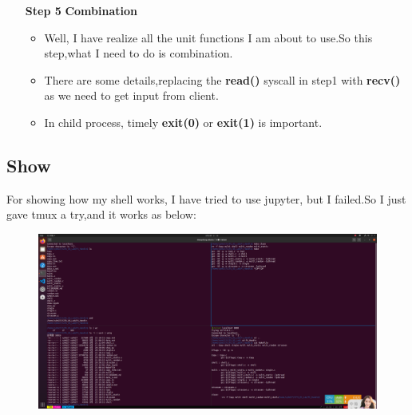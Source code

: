 \documentclass[]{article}
\begin{document}
\begin{enumerate}
            \item[\textbf{Step 5}] \textbf{Combination}
            \begin{itemize}
                \item Well, I have realize all the unit functions I am about to use.So this step,what I need to do is combination.
                \item There are some details,replacing the \textbf{read()} syscall in step1 with \textbf{recv()} as we need to get input from client.
                \item In child process, timely \textbf{exit(0)} or \textbf{exit(1)} is important. 
            \end{itemize}
            
        \end{enumerate}
\subsection*{Show}
For showing how my shell works, I have tried to use jupyter, but I failed.So I just gave tmux a try,and it works as below:
\begin{figure}[H]
    \includegraphics[scale = 0.25]{2023-03-23-12-52-48.png}
\end{figure}
\end{document}

